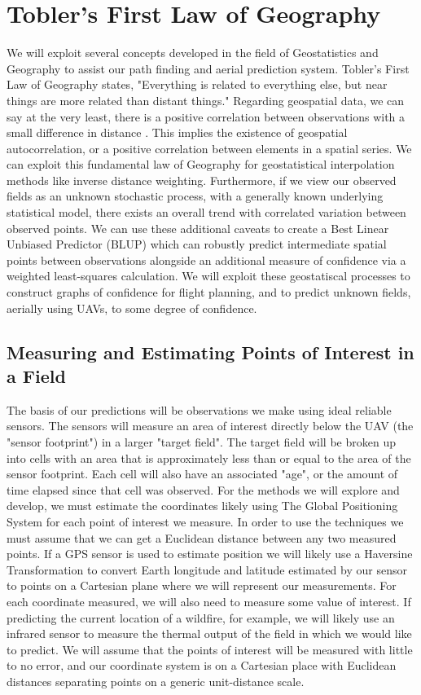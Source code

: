 \documentclass[11pt]{ucthesis}
\begin{document}
\section{Tobler's First Law of Geography}
We will exploit several concepts developed in the field of Geostatistics and Geography to assist our path finding and aerial prediction system. Tobler's First Law of Geography \cite{tobler:first_law} states, "Everything is related to everything else, but near things are more related than distant things." Regarding geospatial data, we can say at the very least, there is a positive correlation between observations with a small difference in distance \cite{miller:on_toblers_first_law}. This implies the existence of geospatial autocorrelation, or a positive correlation between elements in a spatial series. We can exploit this fundamental law of Geography for geostatistical interpolation methods like inverse distance weighting. Furthermore, if we view our observed fields as an unknown stochastic process, with a generally known underlying statistical model, there exists an overall trend with correlated variation between observed points. We can use these additional caveats to create a Best Linear Unbiased Predictor (BLUP) which can robustly predict intermediate spatial points between observations alongside an additional measure of confidence via a weighted least-squares calculation. We will exploit these geostatiscal processes to construct graphs of confidence for flight planning, and to predict unknown fields, aerially using UAVs, to some degree of confidence.

\subsection{Measuring and Estimating Points of Interest in a Field}
The basis of our predictions will be observations we make using ideal reliable sensors. The sensors will measure an area of interest directly below the UAV (the "sensor footprint") in a larger "target field". The target field will be broken up into cells with an area that is approximately less than or equal to the area of the sensor footprint. Each cell will also have an associated "age", or the amount of time elapsed since that cell was observed. For the methods we will explore and develop, we must estimate the coordinates likely using The Global Positioning System for each point of interest we measure. In order to use the techniques we must assume that we can get a Euclidean distance between any two measured points. If a GPS sensor is used to estimate position we will likely use a Haversine Transformation to convert Earth longitude and latitude estimated by our sensor to points on a Cartesian plane where we will represent our measurements. For each coordinate measured, we will also need to measure some value of interest. If predicting the current location of a wildfire, for example, we will likely use an infrared sensor to measure the thermal output of the field in which we would like to predict. We will assume that the points of interest will be measured with little to no error, and our coordinate system is on a Cartesian place with Euclidean distances separating points on a generic unit-distance scale.
\end{document}
